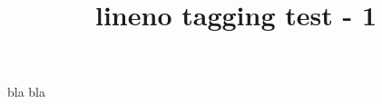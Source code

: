 \documentclass{article}
\title{lineno tagging test - 1}
\begin{document}
\begin{linenumbers}
bla bla
\end{linenumbers}
\end{document}

